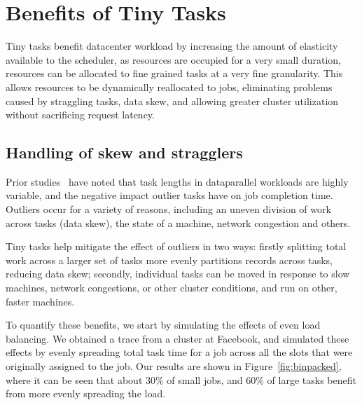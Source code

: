 \section{Benefits of Tiny Tasks}
\label{sec:benefits}

Tiny tasks benefit datacenter workload by increasing the amount of elasticity
available to the scheduler, as resources are occupied for a very small duration,
resources can be allocated to fine grained tasks at a very fine granularity. This 
allows resources to be dynamically reallocated to jobs, eliminating problems caused
by straggling tasks, data skew, and allowing greater cluster utilization without
sacrificing request latency.

\subsection{Handling of skew and stragglers}
Prior studies~\cite{ananthanarayanan2010reining,zaharia2008improving} have noted that
task lengths in dataparallel workloads are highly variable, and the negative impact outlier
tasks have on job completion time. Outliers occur for a variety of reasons, including an
uneven division of work across tasks (data skew), the state of a machine, network congestion
and others. 

Tiny tasks help mitigate the effect of outliers in two ways: firstly splitting total work
across a larger set of tasks more evenly partitions records across tasks, reducing data skew;
secondly, individual tasks can be moved in response to slow machines, network congestions, or
other cluster conditions, and run on other, faster machines.

To quantify these benefits, we start by simulating the effects of even load balancing. We obtained
a trace from a cluster at Facebook, and simulated these effects by evenly spreading total task time
for a job across all the slots that were originally assigned to the job. Our results are shown in
Figure~\ref{fig:binpacked}, where it can be seen that about $30\%$ of small jobs, and $60\%$ of 
large tasks benefit from more evenly spreading the load. 

